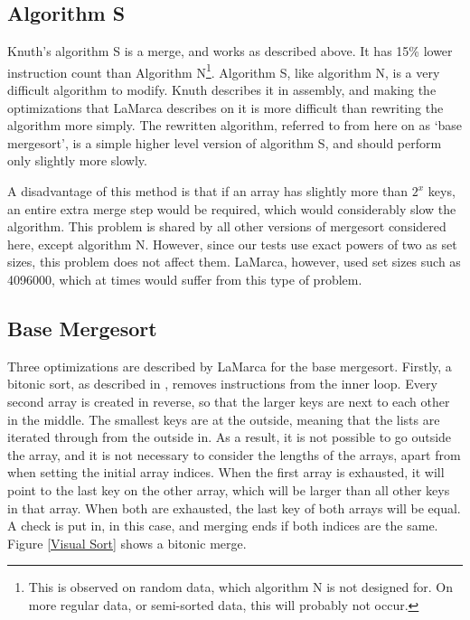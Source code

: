 \subsection{Algorithm S}

Knuth's algorithm S is a  merge, and works as described above. It has
15\% lower instruction count than Algorithm N\footnote{This is observed on
random data, which algorithm N is not designed for. On more regular data, or
semi-sorted data, this will probably not occur.}. Algorithm S, like algorithm N,
is a very difficult algorithm to modify. Knuth describes it in assembly, and
making the optimizations that LaMarca describes on it is more difficult than
rewriting the algorithm more simply. The rewritten algorithm, referred to from
here on as `base mergesort', is a simple higher level version of algorithm S,
and should perform only slightly more slowly.

A disadvantage of this method is that if an array has slightly more than $2^x$
keys, an entire extra merge step would be required, which would considerably
slow the algorithm. This problem is shared by all other versions of mergesort
considered here, except algorithm N. However, since our tests use exact
powers of two as set sizes, this problem does not affect them. LaMarca,
however, used set sizes such as 4096000, which at times would suffer from this
type of problem.

\subsection{Base Mergesort}
\label{base mergesort}
Three optimizations are described by LaMarca for the base mergesort. Firstly, a
bitonic sort, as described in \cite{Sedgewick02}, removes instructions from the
inner loop. Every second array is created in reverse, so that the larger keys  
are next to each other in the middle. The smallest keys are at the outside,
meaning that the lists are iterated through from the outside in. As a result, it
is not possible to go outside the array, and it is not necessary to consider the
lengths of the arrays, apart from when setting the initial array indices. When
the first array is exhausted, it will point to the last key on the other array,
which will be larger than all other keys in that array. When both are
exhausted, the last key of both arrays will be equal. A check is put in, in this
case, and merging ends if both indices are the same. Figure \vref{Visual Sort}
shows a bitonic merge.

